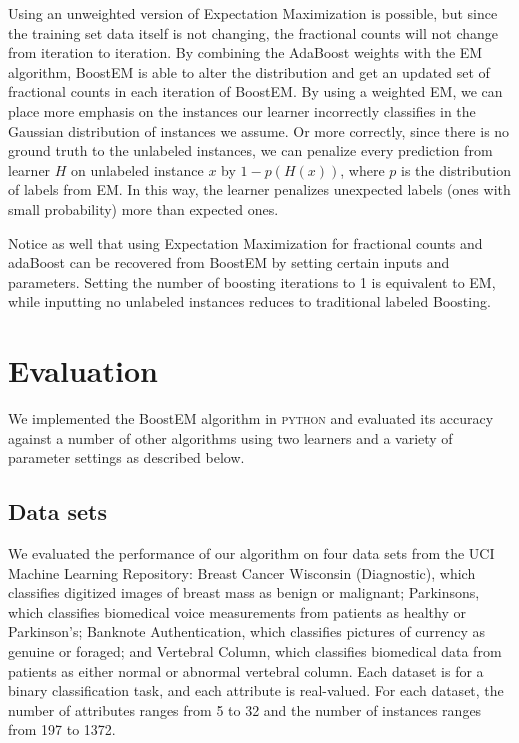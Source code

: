 \documentclass{sig-alternate}
\begin{document}
 Using an unweighted version of Expectation Maximization is possible, but since the training set data itself is not changing, the fractional counts will not change from iteration to iteration. By combining the AdaBoost weights with the EM algorithm, BoostEM is able to alter the distribution and get an updated set of fractional counts in each iteration of BoostEM.   By using a weighted EM, we can place more emphasis on the instances our learner incorrectly classifies in the Gaussian distribution of instances we assume. Or more correctly, since there is no ground truth to the unlabeled instances, we can penalize every prediction from learner $H$ on unlabeled instance $x$ by $1-p(H(x))$, where $p$ is the distribution of labels from EM.  In this way, the learner penalizes unexpected labels (ones with small probability) more than expected ones.



Notice as well that using Expectation Maximization for fractional counts and adaBoost can be recovered from BoostEM by setting certain inputs and parameters.  Setting the number of boosting iterations to 1 is equivalent to EM, while inputting no unlabeled instances reduces to traditional labeled Boosting.    
    
\section{Evaluation}
We implemented the BoostEM algorithm in \textsc{python} and evaluated its accuracy against a number of other algorithms using two learners and a variety of parameter settings  as described below.


\subsection{Data sets}

We evaluated the performance of our algorithm on four data sets from the UCI Machine Learning Repository: Breast Cancer Wisconsin (Diagnostic), which classifies digitized images of breast mass as benign or malignant; Parkinsons, which classifies biomedical voice measurements from patients as healthy or Parkinson's; Banknote Authentication, which classifies pictures of currency as genuine or foraged; and Vertebral Column, which classifies biomedical data from patients as either normal or abnormal vertebral column. Each dataset is for a binary classification task, and each attribute is real-valued. For each dataset, the number of attributes ranges from 5 to 32 and the number of instances ranges from 197 to 1372. 
\end{document}
